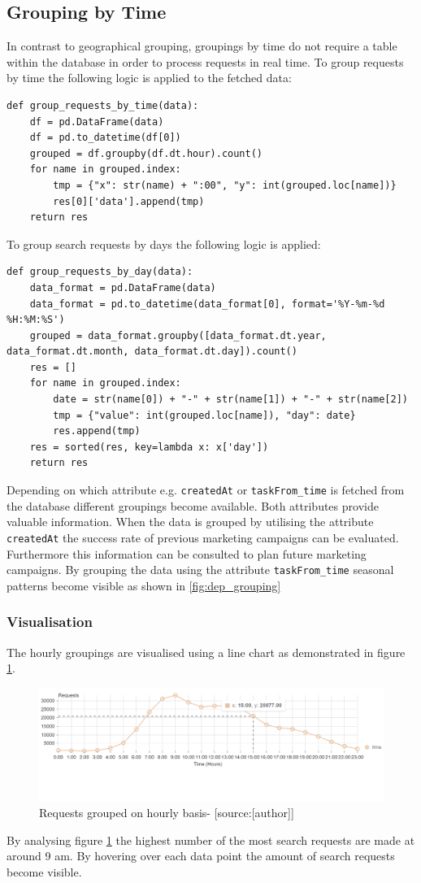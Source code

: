 \subsection{Grouping by Time}
In contrast to geographical grouping, groupings by time do not require a table within the database in order to process requests in real time. To group requests by time the following logic is applied to the fetched data: 
\begin{lstlisting}
def group_requests_by_time(data):
    df = pd.DataFrame(data)
    df = pd.to_datetime(df[0])
    grouped = df.groupby(df.dt.hour).count()
    for name in grouped.index:
        tmp = {"x": str(name) + ":00", "y": int(grouped.loc[name])}
        res[0]['data'].append(tmp)
    return res
\end{lstlisting}
To group search requests by days the following logic is applied: 
\begin{lstlisting}
def group_requests_by_day(data):
    data_format = pd.DataFrame(data)
    data_format = pd.to_datetime(data_format[0], format='%Y-%m-%d %H:%M:%S')
    grouped = data_format.groupby([data_format.dt.year, data_format.dt.month, data_format.dt.day]).count()
    res = []
    for name in grouped.index:
        date = str(name[0]) + "-" + str(name[1]) + "-" + str(name[2])
        tmp = {"value": int(grouped.loc[name]), "day": date}
        res.append(tmp)
    res = sorted(res, key=lambda x: x['day'])
    return res
\end{lstlisting}
Depending on which attribute e.g. \verb|createdAt| or \verb|taskFrom_time| is fetched from the database different groupings become available. Both attributes provide valuable information. When the data is grouped by utilising the attribute \verb|createdAt| the success rate of previous marketing campaigns can be evaluated. Furthermore this information can be consulted to plan future marketing campaigns. By grouping the data using the attribute \verb|taskFrom_time| seasonal patterns become visible as shown in \ref{fig:dep_grouping}
\subsubsection{Visualisation}
The hourly groupings are visualised using a line chart as demonstrated in figure \ref{fig:hourly_grouping}.
\begin{figure}[H]
	\centering
		\includegraphics[width=15cm]{images/hourly_grouping}
	\caption{Requests grouped on hourly basis- [source:[author]]}
	\label{fig:hourly_grouping}
\end{figure}
By analysing figure \ref{fig:hourly_grouping} the highest number of the most search requests are made at around 9 am. By hovering over each data point the amount of search requests become visible. 
\newline
 
